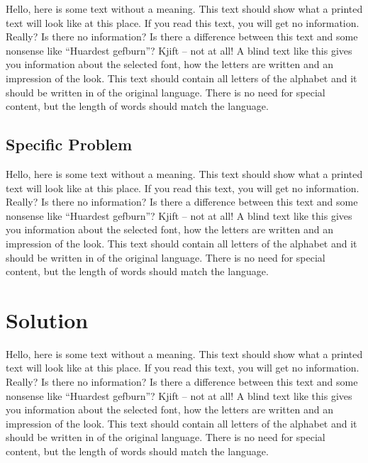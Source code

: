 \documentclass[%
  english,%
  todotools=true,%
  trtype=singlereport,draft%
]{hpitr}
\begin{document}
Hello, here is some text without a meaning. This text should show
what a printed text will look like at this place. If you read this
text, you will get no information. Really? Is there no information?
Is there a difference between this text and some nonsense like
“Huardest gefburn”? Kjift – not at all! A blind text like this gives
you information about the selected font, how the letters are written
and an impression of the look. This text should contain all letters
of the alphabet and it should be written in of the original
language. There is no need for special content, but the length of
words should match the language.~\cite{953350}

\subsection{Specific Problem}
\label{sec:specific-problem}

Hello, here is some text without a meaning. This text should show
what a printed text will look like at this place. If you read this
text, you will get no information. Really? Is there no information?
Is there a difference between this text and some nonsense like
“Huardest gefburn”? Kjift – not at all! A blind text like this gives
you information about the selected font, how the letters are written
and an impression of the look. This text should contain all letters
of the alphabet and it should be written in of the original
language. There is no need for special content, but the length of
words should match the language.

\section{Solution}
\label{sec:solution}

%
Hello, here is some text without a meaning. This text should show
what a printed text will look like at this place. If you read this
text, you will get no information. Really? Is there no information?
Is there a difference between this text and some nonsense like
“Huardest gefburn”? Kjift – not at all! A blind text like this gives
you information about the selected font, how the letters are written
and an impression of the look. This text should contain all letters
of the alphabet and it should be written in of the original
language. There is no need for special content, but the length of
words should match the language.
\end{document}
